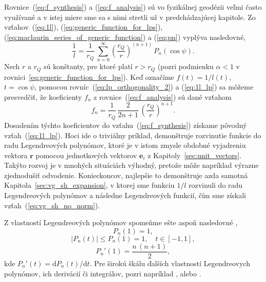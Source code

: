 \documentclass[a4paper, 12pt]{book}
\newcommand{\diff}{\mathrm d}
\let\vec\mathbf
\begin{document}
Rovnice~(\ref{eq:f_synthesis}) a (\ref{eq:f_analysis}) sú vo fyzikálnej 
geodézii veľmi často využívané a  v istej miere sme sa s nimi stretli už 
v predchádzajúcej kapitole.  Zo vzťahov~(\ref{eq:1l}), 
(\ref{eq:generic_function_for_lps}), 
(\ref{eq:maclaurin_series_of_generic_function}) a (\ref{eq:pn}) vyplýva 
nasledovné,
%
\begin{equation}
\label{eq:1l_lp}
\frac{1}{l} = \frac{1}{r_Q} \, \sum_{n = 0}^\infty \left( \frac{r_Q}{r} 
\right)^{(n + 1)} \, P_n(\cos\psi){.}
\end{equation}
%
Nech $r$ a $r_Q$ sú konštanty, pre ktoré platí $r > r_Q$ (pozri podmienku 
$\alpha < 1$ v rovnici~\ref{eq:generic_function_for_lps}).  Keď označíme $f(t) 
= 1 \slash l(t)$, $t = \cos\psi$, pomocou rovníc~(\ref{eq:lp_orthogonality_2}) 
a (\ref{eq:1l_lp}) sa môžeme presvedčiť, že koeficienty $f_n$ 
z rovnice~(\ref{eq:f_analysis}) sú dané vzťahom
%
\begin{equation}
f_n = \frac{1}{r_Q} \, \frac{2}{2n + 1} \, \left( \frac{r_Q}{r} \right)^{n 
+ 1}{.}
\end{equation}
%
Dosadením týchto koeficientov do vzťahu~(\ref{eq:f_synthesis}) získame pôvodný 
vzťah~(\ref{eq:1l_lp}).  Hoci ide o triviálny príklad, demonštruje rozvinutie 
funkcie do radu Legendreových polynómov, ktoré je v istom zmysle obdobné 
vyjadreniu vektora $\vec r$ pomocou jednotkových vektorov $\vec e_i$ 
z Kapitoly~\ref{sec:unit_vectors}.  Takýto rozvoj je v mnohých situáciách 
výhodný, pretože môže napríklad výrazne zjednodušiť odvodenie.  Konieckoncov, 
najlepšie to demonštruje azda samotná Kapitola~\ref{sec:vg_sh_expansion}, 
v ktorej sme funkciu $1 \slash l$ rozvinuli do radu Legendreových polynómov 
a následne Legendreových funkcií, čím sme získali 
vzťah~(\ref{eq:vg_sh_no_norm}).

Z vlastností Legendreových polynómov spomeňme ešte aspoň nasledovné
\citep{Freeden2009},
%
\begin{equation}
P_n(1) = 1{,}
\end{equation}
%
\begin{equation}
|P_n(t)| \leq P_n(1) = 1{,} \quad t \in [-1, 1]{,}
\end{equation}
%
\begin{equation}
P_n'(1) = \frac{n \, (n + 1)}{2}{,}
\end{equation}
%
kde $P_n'(t) = \diff P_n(t) \slash \diff t$.  Pre širokú škálu ďalších 
vlastností Legendreovych polynómov, ich derivácií či integrálov, pozri 
napríklad \cite{Gradshteyn2007}, \cite{Freeden2009} alebo \cite{Olver2010}.
\end{document}
